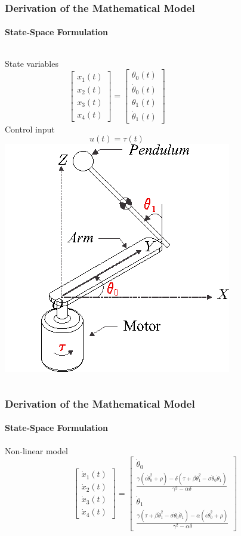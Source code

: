 \documentclass[]{beamer}
\begin{document}
\begin{frame}
	\frametitle{Derivation of the Mathematical Model}
	\framesubtitle{State-Space Formulation}
	  	\begin{columns}[c]
		\column{2in}  %
State variables
\begin{equation*}
\begin{bmatrix}
x_1(t)\\x_2(t)\\x_3(t)\\x_4(t)
\end{bmatrix} = \begin{bmatrix}
\theta_0(t)\\\dot{\theta}_0(t)\\\theta_1(t)\\\dot{\theta}_1(t)
\end{bmatrix}
\end{equation*}
Control input
\begin{equation*}
u(t) = \tau (t)
\end{equation*}
		\column{2in}
		\includegraphics[scale=0.55]{images/furuta2.png}
	\end{columns}
\end{frame}
\begin{frame}
	\frametitle{Derivation of the Mathematical Model}
	\framesubtitle{State-Space Formulation}
	Non-linear model
	\begin{equation*}
	\begin{bmatrix}
	\dot{x}_1(t) \\ \dot{x}_2(t) \\ \dot{x}_3(t) \\ \dot{x}_4(t)
	\end{bmatrix} = \begin{bmatrix}
	\dot{\theta}_0\\
	\frac{\gamma(\epsilon\dot{\theta}_0^2+\rho)-\delta(\tau+\beta\dot{\theta}_1^2-\sigma\dot{\theta}_0\dot{\theta}_1)}{\gamma^2-\alpha\delta}\\
	\dot{\theta}_1\\
	\frac{\gamma(\tau+\beta\dot{\theta}_1^2-\sigma\dot{\theta}_0\dot{\theta}_1)-\alpha(\epsilon\dot{\theta}_0^2+\rho)}{\gamma^2-\alpha\delta}
	\end{bmatrix}
	\end{equation*}
\end{frame}
\end{document}
